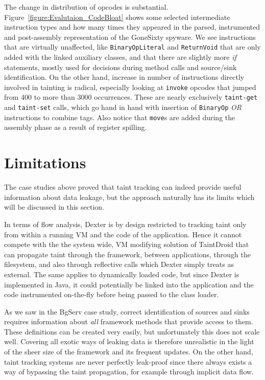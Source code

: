 \documentclass[12pt,twoside,notitlepage]{report}
\begin{document}
The change in distribution of opcodes is substantial. Figure~\ref{figure:Evalutaion_CodeBloat} shows some selected intermediate instruction types and how many times they appeared in the parsed, instrumented and post-assembly representation of the GoneSixty spyware. We see instructions that are virtually unaffected, like \verb$BinaryOpLiteral$ and \verb$ReturnVoid$ that are only added with the linked auxiliary classes, and that there are slightly more \emph{if} statements, mostly used for decisions during method calls and source/sink identification. On the other hand, increase in number of instructions directly involved in tainting is radical, especially looking at \verb$invoke$ opcodes that jumped from 400 to more than 3000 occurrences. These are nearly exclusively \verb$taint-get$ and \verb$taint-set$ calls, which go hand in hand with insertion of \verb$BinaryOp$ \emph{OR} instructions to combine tags. Also notice that \verb$move$s are added during the assembly phase as a result of register spilling.

\section{Limitations}

The case studies above proved that taint tracking can indeed provide useful information about data leakage, but the approach naturally has its limits which will be discussed in this section. 

In terms of flow analysis, Dexter is by design restricted to tracking taint only from within a running VM and the code of the application. Hence it cannot compete with the the system wide, VM modifying solution of TaintDroid that can propagate taint through the framework, between applications, through the filesystem, and also through reflective calls which Dexter simply treats as external. The same applies to dynamically loaded code, but since Dexter is implemented in Java, it could potentially be linked into the application and the code instrumented on-the-fly before being passed to the class loader.

As we saw in the BgServ case study, correct identification of sources and sinks requires information about \emph{all} framework methods that provide access to them. These definitions can be created very easily, but unfortunately this does not scale well. Covering all exotic ways of leaking data is therefore unrealistic in the light of the sheer size of the framework and its frequent updates. On the other hand, taint tracking systems are never perfectly leak-proof since there always exists a way of bypassing the taint propagation, for example through implicit data flow.
\end{document}
